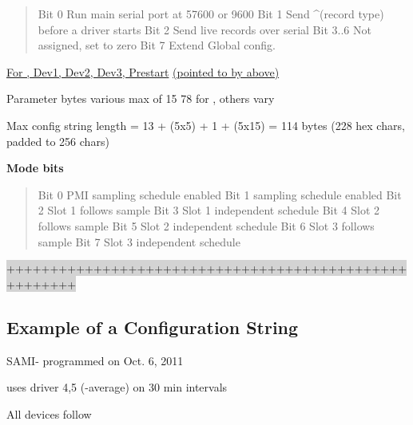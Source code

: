 \begin{quote}
	Bit 0 Run main serial port at 57600 or 9600\newline
	Bit 1 Send \^{}(record type) before a driver starts\newline
	Bit 2 Send live records over serial\newline
	Bit 3..6 Not assigned, set to zero\newline
	Bit 7 Extend Global config.\newline
\end{quote}

\underline{For \instType{}, Dev1, Dev2, Dev3, Prestart} \underline{(pointed to by above)}

Parameter bytes        various       max of 15       78 for \instType{}, others vary

Max config string length = 13 + (5x5) + 1 + (5x15) = 114 bytes (228 hex
chars, padded to 256 chars)

\textbf{Mode bits}

\begin{quote}
	Bit 0 PMI sampling schedule enabled\newline
	Bit 1 \instType{} sampling schedule enabled\newline
	Bit 2 Slot 1 follows \instType{} sample\newline
	Bit 3 Slot 1 independent schedule\newline
	Bit 4 Slot 2 follows \instType{} sample\newline
	Bit 5 Slot 2 independent schedule\newline
	Bit 6 Slot 3 follows \instType{} sample\newline
	Bit 7 Slot 3 independent schedule\newline
\end{quote}

\begin{center}
\colorbox{lightgray}{++++++++++++++++++++++++++++++++++++++++++++++++++++++}\\
\end{center}


\subsection*{Example of a Configuration String}

SAMI-\dioxide{} programmed on Oct. 6, 2011

\instType{} uses driver 4,5 (\dioxide{}-average) on 30 min intervals

All devices follow \instType{}

